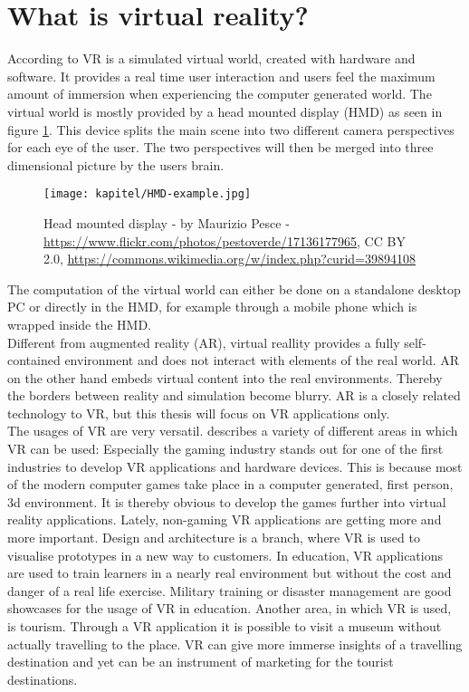 \section{What is virtual reality?}
According to \cite{Fuchs.2011} VR is a simulated virtual world, created with hardware and software. It provides a real time user interaction and users feel the maximum amount of immersion when experiencing the computer generated world. The virtual world is mostly provided by a head mounted display (HMD) as seen in figure \ref{fig:hmd}. This device splits the main scene into two different camera perspectives for each eye of the user. The two perspectives will then be merged into three dimensional picture by the users brain. \\
\begin{figure}[h!]
  \texttt{[image: kapitel/HMD-example.jpg]}
  \centering
  \caption{Head mounted display - by Maurizio Pesce -  \url{https://www.flickr.com/photos/pestoverde/17136177965}, CC BY 2.0, \url{https://commons.wikimedia.org/w/index.php?curid=39894108}
}
  \label{fig:hmd}
\end{figure}
The computation of the virtual world can either be done on a standalone desktop PC or directly in the HMD, for example through a mobile phone which is wrapped inside the HMD.\\
Different from augmented reality (AR), virtual reallity provides a fully self-contained environment and does not interact with elements of the real world. AR on the other hand embeds virtual content into the real environments. Thereby the borders between reality and simulation become blurry. AR is a closely related technology to VR, but this thesis will focus on VR applications only.\\
The usages of VR are very versatil. \cite{Linowes.2015} describes a variety of different areas in which VR can be used: Especially the gaming industry stands out for one of the first industries to develop VR applications and hardware devices. This is because most of the modern computer games take place in a computer generated, first person, 3d environment. It is thereby obvious to develop the games further into virtual reality applications. Lately, non-gaming VR applications are getting more and more important. Design and architecture is a branch, where VR is used to visualise prototypes in a new way to customers. In education, VR applications are used to train learners in a nearly real environment but without the cost and danger of a real life exercise. Military training or disaster management are good showcases for the usage of VR in education. Another area, in which VR is used, is tourism. Through a VR application it is possible to visit a museum without actually travelling to the place. VR can give more immerse insights of a travelling destination and yet can be an instrument of marketing for the tourist destinations.

